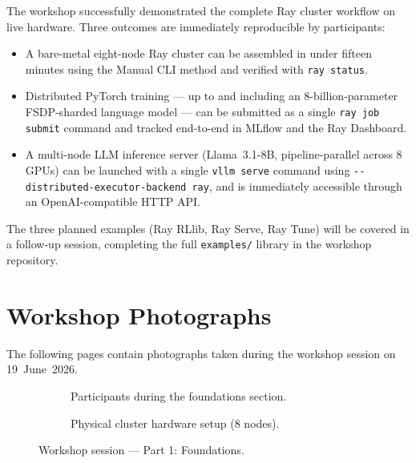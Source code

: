 \documentclass[12pt,a4paper]{article}
\begin{document}
The workshop successfully demonstrated the complete Ray cluster workflow
on live hardware. Three outcomes are immediately reproducible by
participants:

\begin{itemize}
\item A bare-metal eight-node Ray cluster can be assembled in under
fifteen minutes using the Manual CLI method and verified with
\texttt{ray status}.

\item Distributed PyTorch training --- up to and including an
8-billion-parameter FSDP-sharded language model --- can be submitted as
a single \texttt{ray job submit} command and tracked end-to-end in
MLflow and the Ray Dashboard.

\item A multi-node LLM inference server (Llama~3.1-8B, pipeline-parallel
across 8 GPUs) can be launched with a single \texttt{vllm serve}
command using \texttt{-{}-distributed-executor-backend ray}, and is
immediately accessible through an OpenAI-compatible HTTP API.
\end{itemize}

The three planned examples (Ray RLlib, Ray Serve, Ray Tune) will be
covered in a follow-up session, completing the full \texttt{examples/}
library in the workshop repository.

\newpage
\section*{Workshop Photographs}

The following pages contain photographs taken during the workshop
session on 19~June~2026.

\vspace{1.5em}

\begin{figure}[H]
\centering
\begin{subfigure}[t]{0.47\textwidth}
  \centering
  \fbox{\rule{0pt}{5.5cm}\hspace{\dimexpr\linewidth-2\fboxsep-2\fboxrule\relax}}
  \caption{Participants during the foundations section.}
\end{subfigure}
\hfill
\begin{subfigure}[t]{0.47\textwidth}
  \centering
  \fbox{\rule{0pt}{5.5cm}\hspace{\dimexpr\linewidth-2\fboxsep-2\fboxrule\relax}}
  \caption{Physical cluster hardware setup (8 nodes).}
\end{subfigure}
\caption{Workshop session --- Part 1: Foundations.}
\end{figure}
\end{document}
